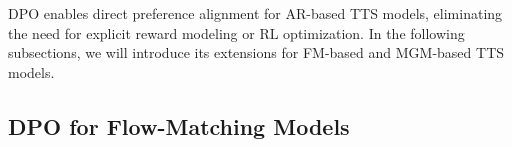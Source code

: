 \documentclass[11pt]{article}
\begin{document}


DPO enables direct preference alignment for AR-based TTS models, eliminating the need for explicit reward modeling or RL optimization. In the following subsections, we will introduce its extensions for FM-based and MGM-based TTS models.

\subsection{DPO for Flow-Matching Models}
\label{method:dpo_fm}
\end{document}
